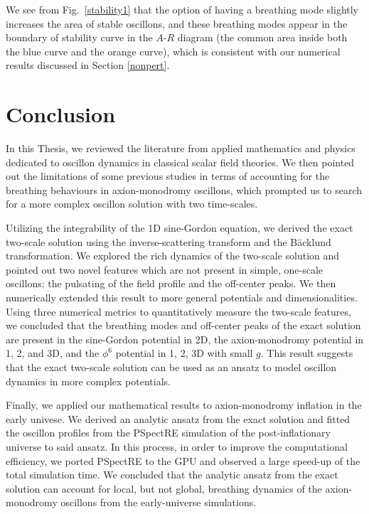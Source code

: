\documentclass[11pt]{book}
\begin{document}
We see from Fig.~\ref{stability1} that the option of having a breathing mode slightly increases the area of stable oscillons, and these breathing modes appear in the boundary of stability curve in the $A$-$R$ diagram (the common area inside both the blue curve and the orange curve), which is consistent with our numerical results discussed in Section \ref{nonpert}.

\chapter{Conclusion}

In this Thesis, we reviewed the literature from applied mathematics and physics dedicated to oscillon dynamics in classical scalar field theories. We then pointed out the limitations of some previous studies in terms of accounting for the breathing behaviours in axion-monodromy oscillons, which prompted us to search for a more complex oscillon solution with two time-scales.

Utilizing the integrability of the 1D sine-Gordon equation, we derived the exact two-scale solution using the inverse-scattering transform and the B\"acklund transformation. We explored the rich dynamics of the two-scale solution and pointed out two novel features which are not present in simple, one-scale oscillons: the pulsating of the field profile and the off-center peaks. We then numerically extended this result to more general potentials and dimensionalities. Using three numerical metrics to quantitatively measure the two-scale features, we concluded that the breathing modes and off-center peaks of the exact solution are present in the sine-Gordon potential in 2D, the axion-monodromy potential in 1, 2, and 3D, and the $\phi^6$ potential in 1, 2, 3D with small $g$. This result suggests that the exact two-scale solution can be used as an ansatz to model oscillon dynamics in more complex potentials.

Finally, we applied our mathematical results to axion-monodromy inflation in the early univese. We derived an analytic ansatz from the exact solution and fitted the oscillon profiles from the PSpectRE simulation of the post-inflationary universe to said ansatz. In this process, in order to improve the computational efficiency, we ported PSpectRE to the GPU and observed a large speed-up of the total simulation time. We concluded that the analytic ansatz from the exact solution can account for local, but not global, breathing dynamics of the axion-monodromy oscillons from the early-universe simulations.

\renewcommand{\bibname}{References}


\end{document}
